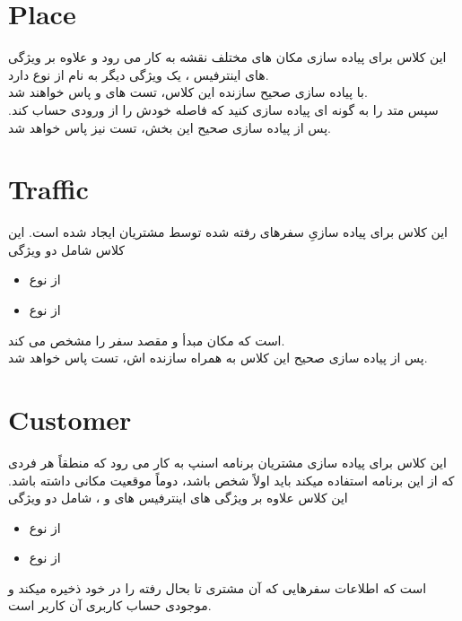     \section{Place}
     این کلاس برای پیاده سازی
    مکان های مختلف نقشه به کار می رود و علاوه بر ویژگی های 
    اینترفیس
    ، 
    یک ویژگی دیگر به نام 
    از نوع
    \grayBox{\textcolor{blue}{string}}
    دارد.
    \\
     با پیاده سازی صحیح سازنده این کلاس، تست های 
    \grayBox{\textcolor{dkgreen}{PlaceInheritedTest}}
    و
    \grayBox{\textcolor{dkgreen}{PlaceConstructorTest}}
    پاس خواهند شد.
    \\
    سپس متد 
    را به گونه ای پیاده سازی کنید که فاصله خودش را از ورودی حساب کند.
    پس از پیاده سازی صحیح این بخش، تست 
    \grayBox{\textcolor{dkgreen}{PlaceDistanceTest}}
    نیز پاس خواهد شد.
    
    \section{Traffic}
    این کلاس برای پیاده سازیِ سفرهای رفته شده توسط مشتریان ایجاد شده است.
    این کلاس شامل دو ویژگی 
    \begin{itemize}
        \item {} از نوع 
            \grayBox{\textcolor{blue}{Place}}
        \item {} از نوع 
            \grayBox{\textcolor{blue}{Place}}
    \end{itemize}
    است که مکان مبدأ و مقصد سفر را مشخص می کند.
    \\
    پس از پیاده سازی صحیح این کلاس به همراه سازنده اش، تست
    \grayBox{\textcolor{dkgreen}{TrafficConstructorTest}}
    پاس خواهد شد.
    
    \section{Customer}
    این کلاس برای پیاده سازی مشتریان برنامه اسنپ به کار می رود  
    که منطقاً 
    هر فردی که از این برنامه استفاده میکند باید اولاً شخص باشد، دوماً موقعیت مکانی داشته باشد.
    این کلاس علاوه بر ویژگی های اینترفیس های 
    و
    ،
    شامل دو ویژگی 
    \begin{itemize}
        \item {} از نوع 
            \grayBox{\textcolor{blue}{long}}
        \item {} از نوع 
            \grayBox{\textcolor{blue}{List<Traffic>}}
    \end{itemize}
    است که 
    اطلاعات سفرهایی که آن مشتری تا بحال رفته را در خود ذخیره میکند و  موجودی حساب کاربری آن کاربر است.
